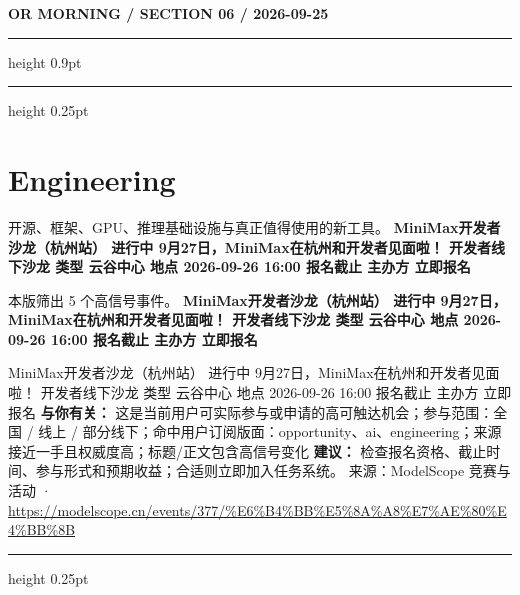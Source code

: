 \documentclass[10.5pt]{ctexart}
\begin{document}
\newpage
{\small\bfseries OR MORNING / SECTION 06 / 2026-09-25}
\vspace{2mm}
\hrule height 0.9pt
\vspace{1.5mm}
\hrule height 0.25pt
\vspace{4mm}
\section*{Engineering}
{\color{ormuted} 开源、框架、GPU、推理基础设施与真正值得使用的新工具。}
\vspace{2mm}
{\LARGE\bfseries MiniMax开发者沙龙（杭州站） 进行中 9月27日，MiniMax在杭州和开发者见面啦！ 开发者线下沙龙 类型 云谷中心 地点 2026-09-26 16:00 报名截止 主办方 立即报名}\par
\vspace{1mm}
{\color{ormuted} 本版筛出 5 个高信号事件。}
\vspace{3mm}
{\Large\bfseries MiniMax开发者沙龙（杭州站） 进行中 9月27日，MiniMax在杭州和开发者见面啦！ 开发者线下沙龙 类型 云谷中心 地点 2026-09-26 16:00 报名截止 主办方 立即报名}\par
MiniMax开发者沙龙（杭州站） 进行中 9月27日，MiniMax在杭州和开发者见面啦！ 开发者线下沙龙 类型 云谷中心 地点 2026-09-26 16:00 报名截止 主办方 立即报名
\textbf{与你有关：} 这是当前用户可实际参与或申请的高可触达机会；参与范围：全国 / 线上 / 部分线下；命中用户订阅版面：opportunity、ai、engineering；来源接近一手且权威度高；标题/正文包含高信号变化
\textbf{建议：} 检查报名资格、截止时间、参与形式和预期收益；合适则立即加入任务系统。
{\footnotesize\color{ormuted} 来源：ModelScope 竞赛与活动 · \url{https://modelscope.cn/events/377/%E6%B4%BB%E5%8A%A8%E7%AE%80%E4%BB%8B}}
\vspace{4mm}
\hrule height 0.25pt
\vspace{3mm}
\end{document}

